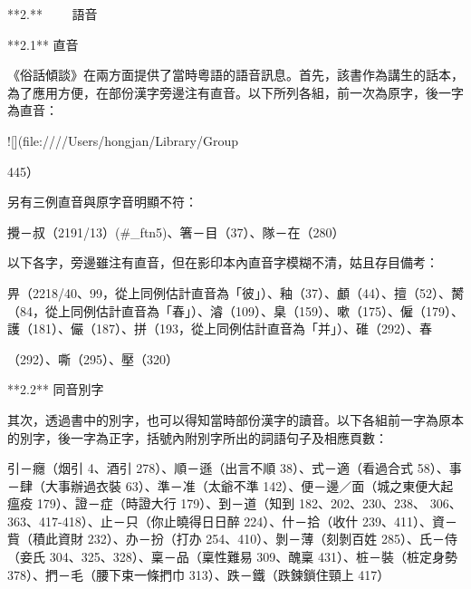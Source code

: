 **2.**     語音

**2.1** 直音

《俗話傾談》在兩方面提供了當時粵語的語音訊息。首先，該書作為講生的話本，為了應用方便，在部份漢字旁邊注有直音。以下所列各組，前一次為原字，後一字為直音：

![](file:////Users/hongjan/Library/Group%

445）

另有三例直音與原字音明顯不符：

攪－叔（2191/13）(#_ftn5)、箸－目（37）、隊－在（280）

以下各字，旁邊雖注有直音，但在影印本內直音字模糊不清，姑且存目備考：

畀（2218/40、99，從上同例估計直音為「彼」）、釉（37）、顱（44）、擅（52）、膥（84，從上同例估計直音為「春」）、濬（109）、臬（159）、嗽（175）、僱（179）、護（181）、儼（187）、拼（193，從上同例估計直音為「并」）、碓（292）、春

（292）、嘶（295）、壓（320）

**2.2** 同音別字

其次，透過書中的別字，也可以得知當時部份漢字的讀音。以下各組前一字為原本的別字，後一字為正字，括號內附別字所出的詞語句子及相應頁數：

引－癮（烟引 4、酒引 278）、順－遜（出言不順 38）、式－適（看過合式 58）、事－肆（大事辦過衣裝 63）、準－准（太爺不準 142）、便－邊／面（城之東便大起瘟疫 179）、證－症（時證大行 179）、到－道（知到 182、202、230、238、 306、363、417-418）、止－只（你止曉得日日醉 224）、什－拾（收什 239、411）、資－貲（積此資財 232）、办－扮（打办 254、410）、剝－薄（刻剝百姓 285）、氏－侍（妾氏 304、325、328）、稟－品（稟性難易 309、醜稟 431）、桩－裝（桩定身勢 378）、捫－毛（腰下束一條捫巾 313）、跌－鐵（跌鍊鎖住頸上 417）

